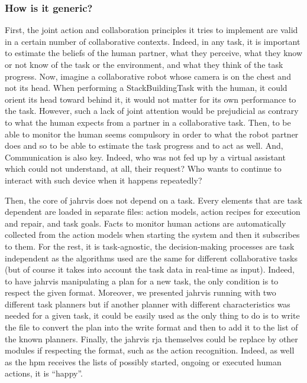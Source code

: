 \documentclass[a4paper,11pt,twoside]{StyleThese}
\begin{document}
\subsubsection*{How is it generic?}
First, the joint action and collaboration principles it tries to implement are valid in a certain number of collaborative contexts. Indeed, in any task, it is important to estimate the beliefs of the human partner, \ie what they perceive, what they know or not know of the task or the environment, and what they think of the task progress. Now, imagine a collaborative robot whose camera is on the chest and not its head. When performing a StackBuildingTask with the human, it could orient its head toward behind it, it would not matter for its own performance to the task. However, such a lack of joint attention would be prejudicial as contrary to what the human expects from a partner in a collaborative task. Then, to be able to monitor the human seems compulsory in order to what the robot partner does and so to be able to estimate the task progress and to act as well. And, Communication is also key. Indeed, who was not fed up by a virtual assistant which could not understand, at all, their request? Who wants to continue to interact with such device when it happens repeatedly? 

Then, the core of \acrshort{jahrvis} does not depend on a task. Every elements that are task dependent are loaded in separate files: action models, action recipes for execution and repair, and task goals. Facts to monitor human actions are automatically collected from the action models when starting the system and then it subscribes to them. For the rest, it is task-agnostic, the decision-making processes are task independent as the algorithms used are the same for different collaborative tasks (but of course it takes into account the task data in real-time as input). Indeed, to have \acrshort{jahrvis} manipulating a plan for a new task, the only condition is to respect the given format. Moreover, we presented \acrshort{jahrvis} running with two different task planners but if another planner with different characteristics was needed for a given task, it could be easily used as the only thing to do is to write the file to convert the plan into the write format and then to add it to the list of the known planners. Finally, the \acrshort{jahrvis} \acrshort{rja} themselves could be replace by other modules if respecting the format, such as the action recognition. Indeed, as well as the \acrlong{hpm} receives the lists of possibly started, ongoing or executed human actions, it is ``happy''.
\end{document}
